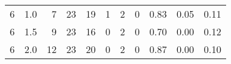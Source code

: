 \begin{tabular}{rrrrrrrrrrr}
                     6 &                        1.0 &                                  7 &                       23 &                      19 &                            1 &                         2 &                        0 &                          0.83 &                                0.05 &                                 0.11 \\
                     6 &                        1.5 &                                  9 &                       23 &                      16 &                            0 &                         2 &                        0 &                          0.70 &                                0.00 &                                 0.12 \\
                     6 &                        2.0 &                                 12 &                       23 &                      20 &                            0 &                         2 &                        0 &                          0.87 &                                0.00 &                                 0.10 \\
\bottomrule
\end{tabular}
